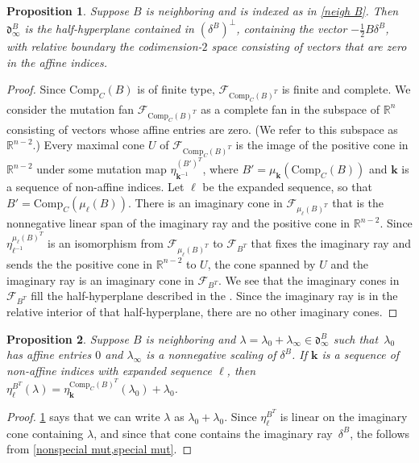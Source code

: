\documentclass{amsart}
\newtheorem{proposition}{Proposition}[section]
\theoremstyle{definition}
\theoremstyle{remark}
\numberwithin{equation}{section}
\newcommand{\reals}{\mathbb R}
\newcommand{\F}{{\mathcal F}}
\newcommand{\0}{{\mathbf{0}}}
\newcommand{\Comp}{\mathrm{Comp}_C}
\newcommand{\kk}{{\boldsymbol{k}}}
\renewcommand{\ll}{{\boldsymbol\ell}}
\renewcommand{\d}{{\mathfrak d}}
\newcommand{\sayD}[1]{\say[D]{#1}}
\begin{document}
\begin{proposition}\label{neigh im wall}
Suppose $B$ is neighboring and is indexed as in \cref{neigh B}.
Then $\d^B_\infty$ is the half-hyperplane contained in $(\delta^B)^\perp$, containing the vector $-\frac12B\delta^B$, with relative boundary the codimension-$2$ space consisting of vectors that are zero in the affine indices.
\end{proposition}
\begin{proof}
Since $\Comp(B)$ is of finite type, $\F_{\Comp(B)^T}$ is finite and complete.
We consider the mutation fan $\F_{\Comp(B)^T}$ as a complete fan in the subspace of $\reals^n$ consisting of vectors whose affine entries are zero. 
(We refer to this subspace as $\reals^{n-2}$.)
Every maximal cone $U$ of $\F_{\Comp(B)^T}$ is the image of the positive cone in $\reals^{n-2}$ under some mutation map $\eta^{(B')^T}_{\kk^{-1}}$, where $B'=\mu_\kk(\Comp(B))$ and $\kk$ is a sequence of non-affine indices.  
Let $\ll$ be the expanded sequence, so that $B'=\Comp(\mu_\ll(B))$.
There is an imaginary cone in $\F_{\mu_\ll(B)^T}$ that is the nonnegative linear span of the imaginary ray and the positive cone in $\reals^{n-2}$.
Since $\eta^{\mu_\ll(B)^T}_{\ll^{-1}}$ is an isomorphism from $\F_{\mu_\ll(B)^T}$ to $\F_{B^T}$ that fixes the imaginary ray and sends the the positive cone in $\reals^{n-2}$ to $U$, the cone spanned by $U$ and the imaginary ray is an imaginary cone in $\F_{B^T}$.
We see that the imaginary cones in $\F_{B^T}$ fill the half-hyperplane described in the .
Since the imaginary ray is in the relative interior of that half-hyperplane, there are no other imaginary cones.
\end{proof}

\begin{proposition}\label{factor eta}
Suppose $B$ is neighboring and $\lambda=\lambda_0+\lambda_\infty\in\d_\infty^B$ such that~$\lambda_0$ has affine entries $0$ and $\lambda_\infty$ is a nonnegative scaling of $\delta^B$.
If $\kk$ is a sequence of non-affine indices with expanded sequence $\ll$, then ${\eta^{B^T}_\ll(\lambda)=\eta_\kk^{\Comp(B)^T}(\lambda_0)+\lambda_0}$.
\end{proposition}
\begin{proof}
  \cref{neigh im wall} says that we can write $\lambda$ as $\lambda_0+\lambda_0$.\sayD{Should one of these be a $\lambda_\infty$?}
Since $\eta_\ll^{B^T}$ is linear on the imaginary cone containing $\lambda$, and since that cone contains the imaginary ray~$\delta^B$, the  follows from \cref{nonspecial mut,special mut}.
\end{proof}
\end{document}
